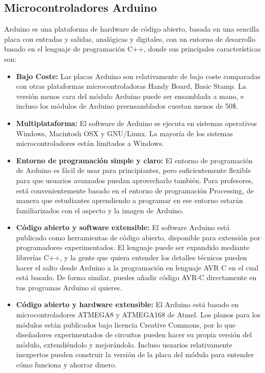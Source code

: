 \documentclass[12pt,a4paper]{article}
\begin{document}
\subsection{Microcontroladores Arduino}
Arduino\cite{ARDUINO} es una plataforma de hardware de código abierto, basada en una sencilla placa con entradas y salidas, analógicas y digitales, con un entorno de desarrollo basado en el lenguaje de programación C++, donde sus principales características son:
\begin{itemize}
	\item \textbf{Bajo Coste:} Las placas Arduino son relativamente de bajo coste comparadas con otras plataformas microcontroladoras Handy Board, Basic Stamp\textregistered. La versión menos cara del módulo Arduino puede ser ensamblada a mano, e incluso los módulos de Arduino preensamblados cuestan menos de 50\$.
	\item \textbf{Multiplataforma:} El software de Arduino se ejecuta en sistemas operativos Windows, Macintosh OSX y GNU/Linux. La mayoría de los sistemas microcontroladores están limitados a Windows.
	\item \textbf{Entorno de programación simple y claro:} El entorno de programación de Arduino es fácil de usar para principiantes, pero suficientemente flexible para que usuarios avanzados puedan aprovecharlo también. Para profesores, está convenientemente basado en el entorno de programación Processing, de manera que estudiantes aprendiendo a programar en ese entorno estarán familiarizados con el aspecto y la imagen de Arduino.
	\item \textbf{Código abierto y software extensible:} El software Arduino está publicado como herramientas de código abierto, disponible para extensión por programadores experimentados. El lenguaje puede ser expandido mediante librerías C++, y la gente que quiera entender los detalles técnicos pueden hacer el salto desde Arduino a la programación en lenguaje AVR C en el cual está basado. De forma similar, puedes añadir código AVR-C directamente en tus programas Arduino si quieres.
	\item \textbf{Código abierto y hardware extensible:} El Arduino está basado en microcontroladores ATMEGA8 y ATMEGA168 de Atmel. Los planos para los módulos están publicados bajo licencia Creative Commons, por lo que diseñadores experimentados de circuitos pueden hacer su propia versión del módulo, extendiéndolo y mejorándolo. Incluso usuarios relativamente inexpertos pueden construir la versión de la placa del módulo para entender cómo funciona y ahorrar dinero.

\end{itemize}
\end{document}
